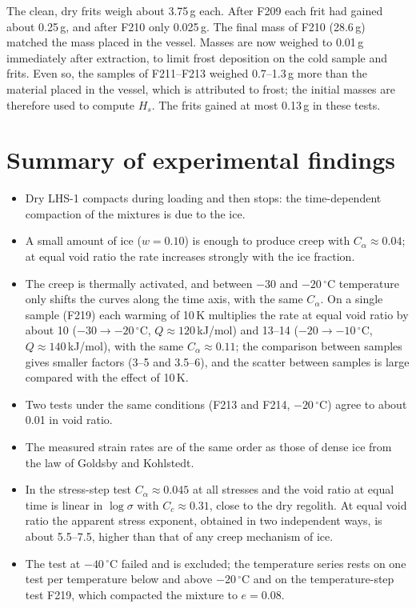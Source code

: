 The clean, dry frits weigh about 3.75\,g each. After F209 each frit had gained about 0.25\,g, and after F210 only 0.025\,g. The final mass of F210 (28.6\,g) matched the mass placed in the vessel. Masses are now weighed to 0.01\,g immediately after extraction, to limit frost deposition on the cold sample and frits. Even so, the samples of F211--F213 weighed 0.7--1.3\,g more than the material placed in the vessel, which is attributed to frost; the initial masses are therefore used to compute $H_s$. The frits gained at most 0.13\,g in these tests.

\section{Summary of experimental findings}
\label{sec:results_summary}

\begin{itemize}
    \item Dry LHS-1 compacts during loading and then stops: the time-dependent compaction of the mixtures is due to the ice.
    \item A small amount of ice ($w = 0.10$) is enough to produce creep with $C_\alpha\approx0.04$; at equal void ratio the rate increases strongly with the ice fraction.
    \item The creep is thermally activated, and between $-30$ and $-20\,^\circ$C temperature only shifts the curves along the time axis, with the same $C_\alpha$. On a single sample (F219) each warming of 10\,K multiplies the rate at equal void ratio by about 10 ($-30\to-20\,^\circ$C, $Q\approx120$\,kJ/mol) and 13--14 ($-20\to-10\,^\circ$C, $Q\approx140$\,kJ/mol), with the same $C_\alpha\approx0.11$; the comparison between samples gives smaller factors (3--5 and 3.5--6), and the scatter between samples is large compared with the effect of 10\,K.
    \item Two tests under the same conditions (F213 and F214, $-20\,^\circ$C) agree to about 0.01 in void ratio.
    \item The measured strain rates are of the same order as those of dense ice from the law of Goldsby and Kohlstedt.
    \item In the stress-step test $C_\alpha\approx0.045$ at all stresses and the void ratio at equal time is linear in $\log\sigma$ with $C_c\approx0.31$, close to the dry regolith. At equal void ratio the apparent stress exponent, obtained in two independent ways, is about 5.5--7.5, higher than that of any creep mechanism of ice.
    \item The test at $-40\,^\circ$C failed and is excluded; the temperature series rests on one test per temperature below and above $-20\,^\circ$C and on the temperature-step test F219, which compacted the mixture to $e = 0.08$.
\end{itemize}
